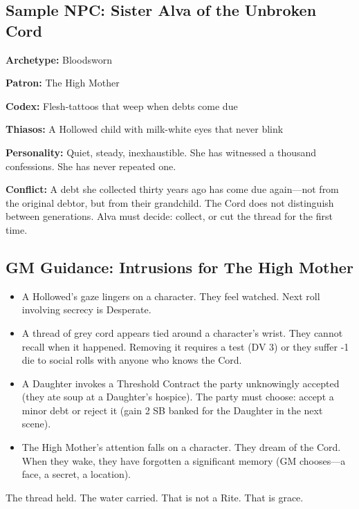 \subsection{Sample NPC: Sister Alva of the Unbroken Cord}

\textbf{Archetype:} Bloodsworn

\textbf{Patron:} The High Mother

\textbf{Codex:} Flesh-tattoos that weep when debts come due

\textbf{Thiasos:} A Hollowed child with milk-white eyes that never blink

\textbf{Personality:} Quiet, steady, inexhaustible. She has witnessed a thousand confessions. She has never repeated one.

\textbf{Conflict:} A debt she collected thirty years ago has come due again—not from the original debtor, but from their grandchild. The Cord does not distinguish between generations. Alva must decide: collect, or cut the thread for the first time.

\subsection{GM Guidance: Intrusions for The High Mother}

\begin{itemize}
\item A Hollowed's gaze lingers on a character. They feel watched. Next roll involving secrecy is Desperate.
\item A thread of grey cord appears tied around a character's wrist. They cannot recall when it happened. Removing it requires a test (DV 3) or they suffer -1 die to social rolls with anyone who knows the Cord.
\item A Daughter invokes a Threshold Contract the party unknowingly accepted (they ate soup at a Daughter's hospice). The party must choose: accept a minor debt or reject it (gain 2 SB banked for the Daughter in the next scene).
\item The High Mother's attention falls on a character. They dream of the Cord. When they wake, they have forgotten a significant memory (GM chooses—a face, a secret, a location).
\end{itemize}

The thread held. The water carried. That is not a Rite. That is grace.
